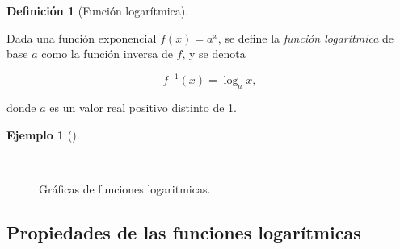 \documentclass[
  a4paper,
]{scrreport}
\theoremstyle{plain}
\theoremstyle{plain}
\theoremstyle{definition}
\newtheorem{definition}{Definición}[chapter]
\theoremstyle{definition}
\newtheorem{example}{Ejemplo}[chapter]
\theoremstyle{plain}
\theoremstyle{remark}
\begin{document}
\leavevmode{}%
\begin{definition}[Función logarítmica]\label{def-funcion-logaritmica}

Dada una función exponencial \(f(x)=a^x\), se define la \emph{función
logarítmica} de base \(a\) como la función inversa de \(f\), y se denota

\[f^{-1}(x)=\log_a x,\]

donde \(a\) es un valor real positivo distinto de 1.

\end{definition}

\leavevmode{}%
\begin{example}[]\label{exm-funcion-logaritmica}

~

\begin{figure}

{\centering 



}

\caption{Gráficas de funciones logaritmicas.}

\end{figure}

\end{example}

\hypertarget{propiedades-de-las-funciones-logaruxedtmicas}{%
\subsection{Propiedades de las funciones
logarítmicas}\label{propiedades-de-las-funciones-logaruxedtmicas}}
\end{document}
